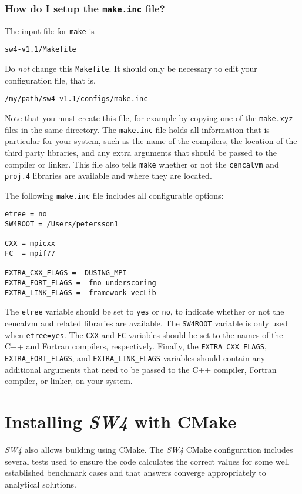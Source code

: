 \documentclass[11pt]{article}
\begin{document}
\subsubsection{How do I setup the {\tt make.inc} file?}

The input file for \verb+make+ is
\begin{verbatim}
sw4-v1.1/Makefile
\end{verbatim}
Do {\em not} change this \verb+Makefile+. It should only be necessary to edit your configuration
file, that is,
\begin{verbatim}
/my/path/sw4-v1.1/configs/make.inc
\end{verbatim}
Note that you must create this file, for example by copying one of the \verb+make.xyz+ files in the
same directory. The \verb+make.inc+ file holds all information that is particular for your system,
such as the name of the compilers, the location of the third party libraries, and any extra
arguments that should be passed to the compiler or linker. This file also tells \verb+make+ whether
or not the \verb+cencalvm+ and \verb+proj.4+ libraries are available and where they are located.

The following \verb+make.inc+ file includes all configurable options:
\begin{verbatim}
etree = no
SW4ROOT = /Users/petersson1

CXX = mpicxx
FC  = mpif77

EXTRA_CXX_FLAGS = -DUSING_MPI
EXTRA_FORT_FLAGS = -fno-underscoring
EXTRA_LINK_FLAGS = -framework vecLib
\end{verbatim}
The \verb+etree+ variable should be set to \verb+yes+ or \verb+no+, to indicate whether or not the
cencalvm and related libraries are available. The \verb+SW4ROOT+ variable is only used when
\verb+etree=yes+. The \verb+CXX+ and \verb+FC+ variables should be set to the names of the C++ and
Fortran compilers, respectively. Finally, the \verb+EXTRA_CXX_FLAGS+, \verb+EXTRA_FORT_FLAGS+, and
\verb+EXTRA_LINK_FLAGS+ variables should contain any additional arguments that need to be passed to
the C++ compiler, Fortran compiler, or linker, on your system.


\section{Installing \emph{SW4} with CMake}\label{cha:installing-cmake-sw4}
\emph{SW4} also allows building using CMake.  The \emph{SW4} CMake configuration includes several tests used to ensure the code calculates the correct values for some well established benchmark cases and that answers converge appropriately to analytical solutions.
\end{document}
